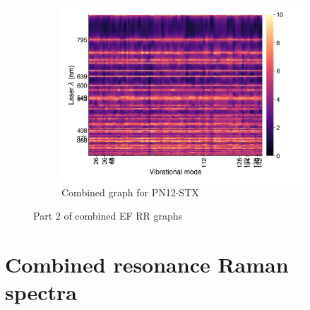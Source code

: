 \documentclass[
	fontsize=10pt, %
	twoside=true, %
	numbers=noenddot, %
]{kaobook}
\begin{document}
\begin{figure}[h]
\begin{subfigure}{8.25cm}\centering\includegraphics{comb-as12}\caption{Combined graph for PN12-STX}\end{subfigure}
\caption[Part 2 of combined EF RR graphs]{Part 2 of combined EF RR graphs}
\end{figure}

\newpage
\section{Combined resonance Raman spectra}


\backmatter %



\printbibliography[heading=bibintoc, title=Bibliography, prenote=bibnote] %
\end{document}
